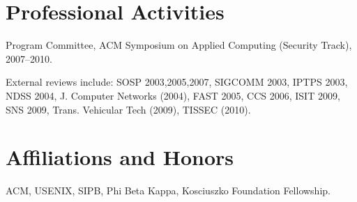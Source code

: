 \documentclass[margin,line,11pt]{resume}
\let\oldsection=\section
\renewcommand{\section}[1]{\oldsection{\small\sc #1}}
\begin{document}
\begin{resume}


\section{Professional Activities}

Program Committee, ACM Symposium on Applied Computing (Security Track),
2007--2010.

External reviews include:
SOSP 2003,2005,2007,
SIGCOMM 2003,
IPTPS 2003,
NDSS 2004,
J. Computer Networks (2004),
FAST 2005,
CCS 2006,
ISIT 2009,
SNS 2009,
Trans. Vehicular Tech (2009),
TISSEC (2010).



\section{Affiliations and Honors}
ACM, USENIX, SIPB, Phi Beta Kappa, Kosciuszko Foundation Fellowship.









\end{resume}
\end{document}
